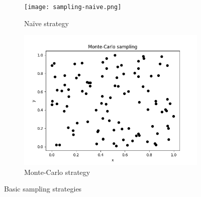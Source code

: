 \begin{figure}[h!]
    \centering
    \begin{subfigure}[b]{0.49\textwidth}
        \texttt{[image: sampling-naive.png]}
        \caption{Naïve strategy}
        \label{fig:sampling-naive}
    \end{subfigure}
    \hfill
    \begin{subfigure}[b]{0.49\textwidth}
        \includegraphics[width=\textwidth]{resources/images/sampling-monte-carlo.png}
        \caption{Monte-Carlo strategy}
        \label{fig:sampling-monte-carlo}
    \end{subfigure}
    \caption{Basic sampling strategies}
\end{figure}

